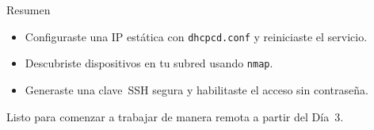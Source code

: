 \documentclass[aspectratio=169,professionalfonts]{beamer}
\begin{document}
\begin{frame}[fragile]{Resumen}
  \begin{itemize}
    \item Configuraste una IP estática con \texttt{dhcpcd.conf} y reiniciaste el servicio.
    \item Descubriste dispositivos en tu subred usando \texttt{nmap}.
    \item Generaste una clave SSH segura y habilitaste el acceso sin contraseña.
  \end{itemize}
  \vspace{0.5em}
  Listo para comenzar a trabajar de manera remota a partir del Día 3.
\end{frame}
\end{document}

